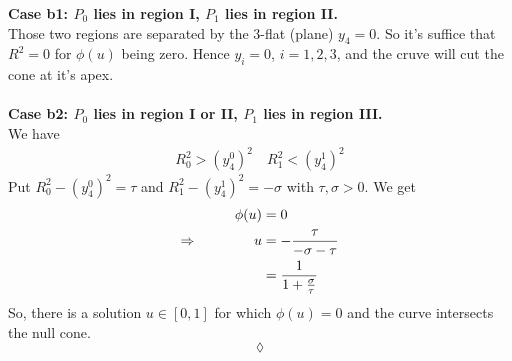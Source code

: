\textbf{Case b1: $P_0$ lies in region I, $P_1$  lies in region II.} \\
Those two regions are separated by the $3$-flat (plane) $y_4=0$. So it's suffice that $R^2=0$ for $\phi(u)$ being zero. Hence $y_i=0$, $  i=1,2,3$, and the cruve will cut the cone at it's apex.
\\\\
\textbf{Case b2: $P_0$ lies in region I or II, $P_1$  lies in region III.} \\
We have 
\begin{align}
R_0^2 > (y_4^{0})^2\quad R_1^2 < (y_4^{1})^2
\end{align}
Put $R_0^2 - (y_4^{0})^2= \tau$ and $R_1^2 - (y_4^{1})^2 =-\sigma$ with $\tau,\sigma >0$. We get
\begin{align}
\phi(u)&=0\\
\Rightarrow \quad\quad\quad\quad u&=-\frac{\tau}{-\sigma-\tau}\\
&= \frac{1}{1+\frac{\sigma}{\tau}}
\end{align}
So, there is a solution $u\in \left[0,1\right]$ for which $\phi(u)=0$ and the curve intersects the null cone.
\\$$\lozenge$$\\\\

